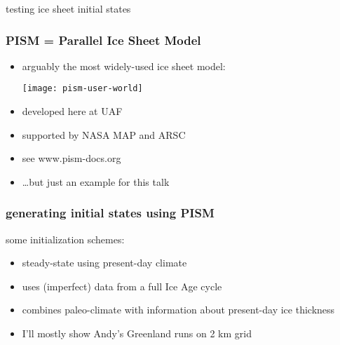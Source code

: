 \documentclass[hide notes,intlimits]{beamer}
\begin{document}
\begin{frame}{testing ice sheet initial states}
  \begin{figure}
    
  \end{figure}
\end{frame}


\begin{frame}
  \frametitle{PISM = Parallel Ice Sheet Model}

  \begin{itemize}
  \item arguably the most widely-used ice sheet model:
     \begin{center}
        \texttt{[image: pism-user-world]}
     \end{center}
  \item developed here at UAF
  \item supported by NASA MAP and ARSC
  \item see \alert{www.pism-docs.org}
  \item \dots but just an example for this talk
  \end{itemize}
\end{frame}


\begin{frame}
  \frametitle{generating initial states using PISM}
  \begin{block}{some initialization schemes:}
    \begin{itemize}
    \item {\color{dark blue}{constant-climate}} steady-state using
present-day climate
    \item {\color{dark orange}{paleo-climate}} uses (imperfect) data from a full Ice Age cycle
    \item {\color{dark violet}{flux-corrected paleo-climate}} combines
paleo-climate with information about present-day ice thickness
    \end{itemize}
  \end{block}

  \begin{itemize}
  \item I'll mostly show Andy's Greenland runs on 2 km grid
  \end{itemize}
\end{frame}
\end{document}
